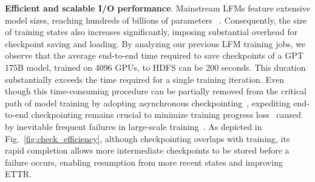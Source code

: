 
\noindent \textbf{Efficient and scalable I/O performance}.
Mainstream LFMs feature extensive model sizes, reaching hundreds of billions of parameters%
~\cite{llama3.1}.
Consequently, the size of training states also increases significantly, imposing substantial overhead for checkpoint saving and loading.
By analyzing our previous LFM training jobs, we observe that 
the average end-to-end time required to save %
checkpoints of a GPT 175B model, trained on 4096 GPUs, to HDFS can be 200 seconds.
This duration substantially exceeds the time required for a single training iteration.
Even though this time-consuming procedure can be partially removed from the critical path of model training by adopting asynchronous checkpointing~\cite{checkfreq, megascale, reft, datastates-llm}, expediting end-to-end checkpointing remains crucial to minimize training progress loss~\cite{gemini-sys} caused by inevitable frequent failures in large-scale training~\cite{megascale}. 
As depicted in Fig.~\ref{fig:check_efficiency}, although checkpointing overlaps with training, its rapid completion allows more intermediate checkpoints to be stored before a failure occurs, enabling resumption from more recent states and improving ETTR.
